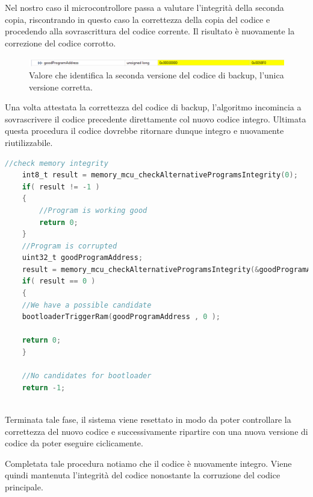 \documentclass[LaM,binding=0.6cm]{../sapthesis}
\begin{document}
Nel nostro caso il microcontrollore passa a valutare l'integrità della seconda copia, riscontrando in questo caso la correttezza della copia del codice e procedendo alla sovrascrittura del codice corrente. Il risultato è nuovamente la correzione del codice corrotto.

\begin{figure}[htbp]
\centerline{\includegraphics[scale=0.55]{examples/DebugBootloader.PNG}}
\caption{Valore che identifica la seconda versione del codice di backup, l'unica versione corretta.}
\label{fig}
\end{figure}
\newline

Una volta attestata la correttezza del codice di backup, l'algoritmo incomincia a sovrascrivere il codice precedente direttamente col nuovo codice integro. Ultimata questa procedura il codice dovrebbe ritornare dunque integro e nuovamente riutilizzabile.
\newline

\begin{lstlisting}[language=C]
    //check memory integrity
    int8_t result = memory_mcu_checkAlternativeProgramsIntegrity(0);
    if( result != -1 )
    {
        //Program is working good
        return 0;    
    }
    //Program is corrupted
    uint32_t goodProgramAddress;
    result = memory_mcu_checkAlternativeProgramsIntegrity(&goodProgramAddress);
    if( result == 0 )
    {
    //We have a possible candidate
    bootloaderTriggerRam(goodProgramAddress , 0 );
    
    return 0;
    }
    
    //No candidates for bootloader
    return -1;
    
\end{lstlisting}

\newline
Terminata tale fase, il sistema viene resettato in modo da poter controllare la correttezza del nuovo codice e successivamente ripartire con una nuova versione di codice da poter eseguire ciclicamente.

Completata tale procedura notiamo che il codice è nuovamente integro. Viene quindi mantenuta l'integrità del codice nonostante la corruzione del codice principale.
\end{document}
